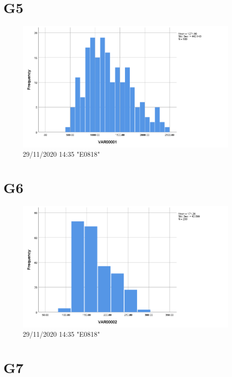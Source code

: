 \documentclass[hidelinks, 12pt, a4paper]{article}
\begin{document}
\section{G5}

\begin{figure}[h!]
	\centering
		\includegraphics[height=.38\textheight, width=\textwidth]{assets/session2/g5.png}
	\caption{29/11/2020 14:35 "E0818"} 
	\end{figure}

\section{G6}

\begin{figure}[h!]
	\centering
		\includegraphics[height=.38\textheight, width=\textwidth]{assets/session2/g6.png}
	\caption{29/11/2020 14:35 "E0818"} 
	\end{figure}

\section{G7}
\end{document}
